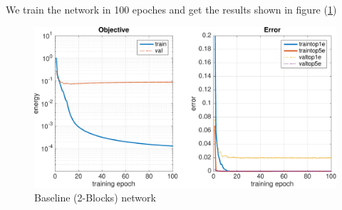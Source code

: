 \documentclass[11pt]{article}
\begin{document}
	We train the network in 100 epoches and get the results shown in figure (\ref{v1})
	\begin{figure}[H]
	    \centering
	    \includegraphics[width=15cm]{v1}
	    \caption{Baseline (2-Blocks) network\label{v1}}
	\end{figure}
\end{document}
